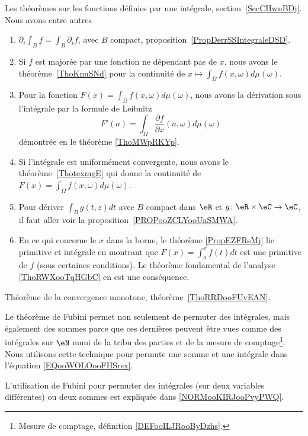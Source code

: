 \begin{description}
    \item[Fonctions définies par une intégrale]
        Les théorèmes sur les fonctions définies par une intégrale, section~\ref{SecCHwnBDj}. Nous avons entre autres
        \begin{enumerate}
            \item
                \( \partial_i\int_Bf=\int_B\partial_if\), avec \( B\) compact, proposition~\ref{PropDerrSSIntegraleDSD}.
            \item
                Si \( f\) est majorée par une fonction ne dépendant pas de \( x\), nous avons le théorème~\ref{ThoKnuSNd} pour la continuité de \( x\mapsto \int_{\Omega}f(x,\omega)d\mu(\omega)\).
            \item
                Pour la fonction $F(x)=\int_{\Omega}f(x,\omega)d\mu(\omega)$, nous avons la dérivation sous l'intégrale par la formule de Leibnitz
                \begin{equation}
                    F'(a)=\int_{\Omega}\frac{ \partial f }{ \partial x }(a,\omega)d\mu(\omega)
                \end{equation}
                démontrée en le théorème \ref{ThoMWpRKYp}.
            \item
                Si l'intégrale est uniformément convergente, nous avons le théorème~\ref{ThotexmgE} qui donne la continuité de $F(x)=\int_{\Omega}f(x,\omega)d\mu(\omega)$.
            \item
                Pour dériver \( \int_Bg(t,z)dt\) avec \( B\) compact dans \( \eR\) et \( g\colon \eR\times \eC\to \eC\), il faut aller voir la proposition~\ref{PROPooZCLYooUaSMWA}.
            \item
                En ce qui concerne le \( x\) dans la borne, le théorème \ref{PropEZFRsMj} lie primitive et intégrale en montrant que \( F(x)=\int_a^xf(t)dt\) est une primitive de \( f\) (sous certaines conditions). Le théorème fondamental de l'analyse \ref{ThoRWXooTqHGbC} en est une conséquence.
        \end{enumerate}
    \item[Conegence monotone]
        Théorème de la convergence monotone, théorème~\ref{ThoRRDooFUvEAN}.
    \item[Fubini]
        Le théorème de Fubini permet non seulement de permuter des intégrales, mais également des sommes parce que ces dernières peuvent être vues comme des intégrales sur \( \eN\) muni de la tribu des parties et de la mesure de comptage\footnote{Mesure de comptage, définition \ref{DEFooILJRooByDzhs}.}. Nous utilisons cette technique pour permute une somme et une intégrale dans l'équation \eqref{EQooWOLOooFHSrsx}.
    \item
        L'utilisation de Fubini pour permuter des intégrales (sur deux variables différentes) ou deux sommes est expliquée dans \ref{NORMooKIRJooPvyPWQ}. 


\end{description}

